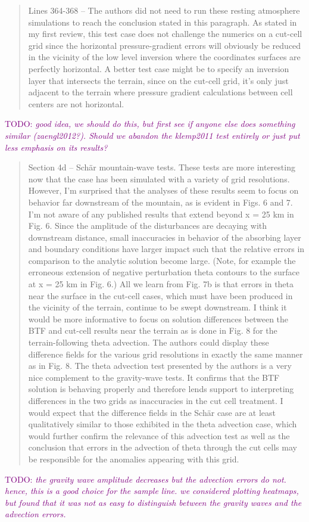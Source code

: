 \documentclass{article}
\newcommand{\TODO}[1]{\textcolor{purple}{TODO: \emph{#1}}}
\begin{document}
\begin{quotation}
 Lines 364-368 – The authors did not need to run these resting atmosphere 
 simulations to reach the conclusion stated in this paragraph. As stated in my first 
 review, this test case does not challenge the numerics on a cut-cell grid since the horizontal pressure-gradient errors will obviously be reduced in the vicinity of the 
 low level inversion where the coordinates surfaces are perfectly horizontal. A better 
 test case might be to specify an inversion layer that intersects the terrain, since on 
 the cut-cell grid, it's only just adjacent to the terrain where pressure gradient 
 calculations between cell centers are not horizontal.   
\end{quotation}
\TODO{good idea, we should do this, but first see if anyone else does something similar (zaengl2012?).  Should we abandon the klemp2011 test entirely or just put less emphasis on its results?}

\begin{quotation}
	Section 4d – Sch\"{a}r mountain-wave tests. These tests are more interesting now that 
 the case has been simulated with a variety of grid resolutions. However, I'm 
 surprised that the analyses of these results seem to focus on behavior far 
 downstream of the mountain, as is evident in Figs. 6 and 7. I'm not aware of any 
 published results that extend beyond x = 25 km in Fig. 6. Since the amplitude of the 
 disturbances are decaying with downstream distance, small inaccuracies in behavior 
 of the absorbing layer and boundary conditions have larger impact such that the 
 relative errors in comparison to the analytic solution become large. (Note, for 
 example the erroneous extension of negative perturbation theta contours to the 
 surface at x = 25 km in Fig. 6.)  All we learn from Fig. 7b is that errors in theta near 
 the surface in the cut-cell cases, which must have been produced in the vicinity of the 
 terrain, continue to be swept downstream. I think it would be more informative to 
 focus on solution differences between the BTF and cut-cell results near the terrain as 
 is done in Fig. 8 for the terrain-following theta advection. The authors could display 
 these difference fields for the various grid resolutions in exactly the same manner as 
 in Fig. 8. The theta advection test presented by the authors is a very nice complement 
 to the gravity-wave tests. It confirms that the BTF solution is behaving properly and 
 therefore lends support to interpreting differences in the two grids as inaccuracies in 
 the cut cell treatment. I would expect that the difference fields in the Sch\"{a}r case are 
 at least qualitatively similar to those exhibited in the theta advection case, which 
 would further confirm the relevance of this advection test as well as the conclusion 
 that errors in the advection of theta through the cut cells may be responsible for the 
 anomalies appearing with this grid.
\end{quotation}
\TODO{the gravity wave amplitude decreases but the advection errors do not.  hence, this is a good choice for the sample line.  we considered plotting heatmaps, but found that it was not as easy to distinguish between the gravity waves and the advection errors.}
\end{document}
